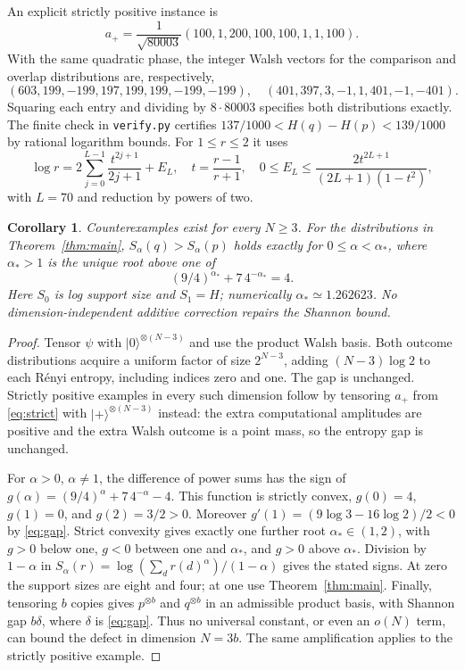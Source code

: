 \documentclass[11pt]{article}
\newtheorem{corollary}[theorem]{Corollary}
\newcommand{\HH}{H}
\begin{document}
An explicit strictly positive instance is
\begin{equation}\label{eq:strict}
 a_+=\frac1{\sqrt{80003}}(100,1,200,100,100,1,1,100).
\end{equation}
With the same quadratic phase, the integer Walsh vectors for the comparison
and overlap distributions are, respectively,
\[
 (603,199,-199,197,199,199,-199,-199),\quad
 (401,397,3,-1,1,401,-1,-401).
\]
Squaring each entry and dividing by $8\cdot80003$ specifies both
distributions exactly. The finite check in \texttt{verify.py} certifies
$137/1000<\HH(q)-\HH(p)<139/1000$ by rational logarithm bounds.
For $1\le r\le2$ it uses
\[
 \log r=2\sum_{j=0}^{L-1}\frac{t^{2j+1}}{2j+1}+E_L,
 \quad t=\frac{r-1}{r+1},\quad
 0\le E_L\le\frac{2t^{2L+1}}{(2L+1)(1-t^2)},
\]
with $L=70$ and reduction by powers of two.

\begin{corollary}\label{cor:extensions}
Counterexamples exist for every $N\ge3$. For the distributions in
Theorem~\ref{thm:main}, $S_\alpha(q)>S_\alpha(p)$ holds exactly for
$0\le\alpha<\alpha_*$, where $\alpha_*>1$ is the unique root above one of
\begin{equation}\label{eq:root}
 (9/4)^{\alpha_*}+7\,4^{-\alpha_*}=4.
\end{equation}
Here $S_0$ is log support size and $S_1=\HH$;
numerically $\alpha_*\simeq1.262623$.
No dimension-independent additive correction repairs the Shannon bound.
\end{corollary}
\begin{proof}
Tensor $\psi$ with $|0\rangle^{\otimes(N-3)}$ and use the product Walsh
basis. Both outcome distributions acquire a uniform factor of size
$2^{N-3}$, adding $(N-3)\log2$ to each R\'enyi entropy, including
indices zero and one. The gap is unchanged.
Strictly positive examples in every such dimension follow by tensoring
$a_+$ from \eqref{eq:strict} with $|+\rangle^{\otimes(N-3)}$ instead:
the extra computational amplitudes are positive and the extra Walsh
outcome is a point mass, so the entropy gap is unchanged.

For $\alpha>0$, $\alpha\ne1$, the difference of power sums has the sign of
$g(\alpha)=(9/4)^\alpha+7\,4^{-\alpha}-4$.
This function is strictly convex, $g(0)=4$, $g(1)=0$,
and $g(2)=3/2>0$. Moreover
$g'(1)=(9\log3-16\log2)/2<0$ by \eqref{eq:gap}.
Strict convexity gives exactly one further root $\alpha_*\in(1,2)$,
with $g>0$ below one, $g<0$ between one and $\alpha_*$,
and $g>0$ above $\alpha_*$. Division by $1-\alpha$ in
$S_\alpha(r)=\log(\sum_dr(d)^\alpha)/(1-\alpha)$ gives the stated signs.
At zero the support sizes are eight and four; at one use Theorem~\ref{thm:main}.
Finally, tensoring $b$ copies gives $p^{\otimes b}$ and $q^{\otimes b}$
in an admissible product basis, with Shannon gap $b\delta$, where
$\delta$ is \eqref{eq:gap}. Thus no universal constant, or even an
$o(N)$ term, can bound the defect in dimension $N=3b$.
The same amplification applies to the strictly positive example.
\end{proof}
\end{document}
